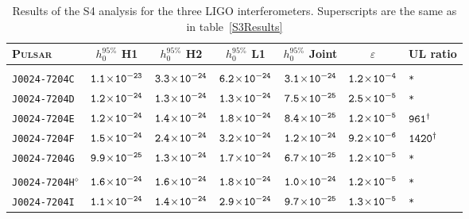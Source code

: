 \begin{longtable}{l | c | c | c | c | c | l}
\caption[Results of the S4 analysis for the three LIGO interferometers.]{\label{S4Results} Results
of the S4 analysis for the three LIGO interferometers. Superscripts are the same as in
table~\ref{S3Results}} \\
\footnotesize{P\textsc{ulsar}} & \footnotesize{$h_0^{95\%}$ H1} & \footnotesize{$h_0^{95\%}$ H2} &
\footnotesize{$h_0^{95\%}$ L1} & \footnotesize{$h_0^{95\%}$ Joint} & \footnotesize{$\varepsilon$} &
\footnotesize{UL ratio} \\ 
\hline \hline \\[-24pt] 
\scriptsize{\tt{J0024-7204C}} & \scriptsize{$\tt{1.1\!\times\!10^{-23}}$} & \scriptsize{$\tt{3.3\!\times\!10^{-24}}$} & \scriptsize{$\tt{6.2\!\times\!10^{-24}}$} & \scriptsize{$\tt{3.1\!\times\!10^{-24}}$} & \scriptsize{$\tt{1.2\!\times\!10^{-4}}$} & \scriptsize{\tt{*}} \\[-16pt] 
\scriptsize{\tt{J0024-7204D}} & \scriptsize{$\tt{1.2\!\times\!10^{-24}}$} & \scriptsize{$\tt{1.3\!\times\!10^{-24}}$} & \scriptsize{$\tt{1.3\!\times\!10^{-24}}$} & \scriptsize{$\tt{7.5\!\times\!10^{-25}}$} & \scriptsize{$\tt{2.5\!\times\!10^{-5}}$} & \scriptsize{\tt{*}} \\[-16pt] 
\scriptsize{\tt{J0024-7204E}} & \scriptsize{$\tt{1.2\!\times\!10^{-24}}$} & \scriptsize{$\tt{1.4\!\times\!10^{-24}}$} & \scriptsize{$\tt{1.8\!\times\!10^{-24}}$} & \scriptsize{$\tt{8.4\!\times\!10^{-25}}$} & \scriptsize{$\tt{1.2\!\times\!10^{-5}}$} & \scriptsize{$\tt{961^{\dagger}}$} \\[-16pt] 
\scriptsize{\tt{J0024-7204F}} & \scriptsize{$\tt{1.5\!\times\!10^{-24}}$} & \scriptsize{$\tt{2.4\!\times\!10^{-24}}$} & \scriptsize{$\tt{3.2\!\times\!10^{-24}}$} & \scriptsize{$\tt{1.2\!\times\!10^{-24}}$} & \scriptsize{$\tt{9.2\!\times\!10^{-6}}$} & \scriptsize{$\tt{1420^{\dagger}}$} \\[-16pt] 
\scriptsize{\tt{J0024-7204G}} & \scriptsize{$\tt{9.9\!\times\!10^{-25}}$} & \scriptsize{$\tt{1.3\!\times\!10^{-24}}$} & \scriptsize{$\tt{1.7\!\times\!10^{-24}}$} & \scriptsize{$\tt{6.7\!\times\!10^{-25}}$} & \scriptsize{$\tt{1.2\!\times\!10^{-5}}$} & \scriptsize{\tt{*}} \\[-16pt] 
\\[-20pt] 
\scriptsize{\tt{J0024-7204H}$^{\diamond}$} & \scriptsize{$\tt{1.6\!\times\!10^{-24}}$} &
\scriptsize{$\tt{1.6\!\times\!10^{-24}}$} & \scriptsize{$\tt{1.8\!\times\!10^{-24}}$} & \scriptsize{$\tt{1.0\!\times\!10^{-24}}$}
& \scriptsize{$\tt{1.2\!\times\!10^{-5}}$} & \scriptsize{\tt{*}} \\[-16pt] 
\scriptsize{\tt{J0024-7204I}} & \scriptsize{$\tt{1.1\!\times\!10^{-24}}$} & \scriptsize{$\tt{1.4\!\times\!10^{-24}}$} & \scriptsize{$\tt{2.9\!\times\!10^{-24}}$} & \scriptsize{$\tt{9.7\!\times\!10^{-25}}$} & \scriptsize{$\tt{1.3\!\times\!10^{-5}}$} & \scriptsize{\tt{*}} \\[-16pt] 

\end{longtable}
